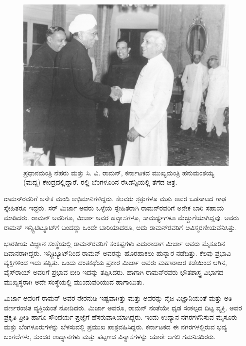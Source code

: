 \begin{figure}[!htpb]
\centering
\includegraphics[scale=0.23]{"images/10.jpg"}
\caption{ಪ್ರಧಾನಮಂತ್ರಿ ನೆಹರು ಮತ್ತು ಸಿ. ವಿ. ರಾಮನ್, ಕರ್ನಾಟಕದ ಮುಖ್ಯಮಂತ್ರಿ ಹನುಮಂತಯ್ಯ (ಮದ್ಯ) ಕೇಂದ್ರದಲ್ಲಿದ್ದಾರೆ. ರಲ್ಲಿ ಬೆಂಗಳೂರಿನ ರೆಸಿಡೆನ್ಸಿಯಲ್ಲಿ ತೆಗೆದ ಚಿತ್ರ.}\label{chap3-fig01}
\end{figure}

\newpage


ರಾಮನ್‍ರವರಿಗೆ ಅನೇಕ ಮಂದಿ ಅಭಿಮಾನಿಗಳಿದ್ದರು. ಕೆಲವರು ಶತ್ರುಗಳೂ ಮತ್ತು ಅವರ ಒಡನಾಟದ ಗಾಢ ಸ್ನೇಹಿತರೂ ಇದ್ದರು. ಸರ್ ಮಿರ್ಜಾ ಅವರು ಒಳ್ಳೆಯ ಸ್ನೇಹಿತರಾಗಿ ರಾಮನ್‍ರವರಿಗೆ ಅನೇಕ ಬಾರಿ ಸಹಾಯ ಮಾಡಿದರು. ರಾಮನ್ ಅವರಿಗೂ, ಮಿರ್ಜಾ ಅವರ ಹವ್ಯಾಸಗಳೂ, ಸಾಮರ್ಥ್ಯಗಳೂ ಮೆಚ್ಚುಗೆಯಾಗಿದ್ದವು. ಅವರು ರಾಮನ್ ಇನ್ಸ್ಟಿಟಿಟ್ಯೂಟ್‍ಗೆ ಬಂದದ್ದು ಒಂದೇ ಬಾರಿಯಾದರೂ, ಅದು ರಾಮನ್‍ರವರಿಗೆ ಅವಿಸ್ಮರಣೀಯವೆನಿಸಿತ್ತು.

ಭಾರತೀಯ ವಿಜ್ಞಾನ ಸಂಸ್ಥೆಯಲ್ಲಿ ರಾಮನ್‍ರವರಿಗೆ ಸಂಕಷ್ಟಗಳು ಎದುರಾದಾಗ ಮಿರ್ಜಾ ಅವರು ಮೈಸೂರಿನ ದಿವಾನರಾಗಿದ್ದರು. ಇನ್ಸ್ಟಿಟ್ಯೂಟ್‍ನಿಂದ ರಾಮನ್ ಅವರನ್ನು ಹೊರಹಾಕಲು ಹುನ್ನಾರ ನಡೆದಿತ್ತು. ಕೆಲವು ಪ್ರಭಾವಿ ವ್ಯಕ್ತಿಗಳಿಂದ ಇದು ತಪ್ಪಿತು. ಒಂದು ದಂತಕಥೆಯ ಪ್ರಕಾರ ಮಿರ್ಜಾ ಅವರು ಮಹಾರಾಜರ ಕಡೆಯಿಂದ ಆಗಿನ, ವೈಸ್‍ರಾಯ್ ಅವರಿಗೆ ಪ್ರಭಾವ ಬೀರಿ ಇದನ್ನು ತಪ್ಪಿಸಿದರು. ಹಾಗಾಗಿ ರಾಮನ್‍ರವರು ಭೌತಶಾಸ್ತ್ರ ವಿಭಾಗದ ಮುಖ್ಯಸ್ಥರಾಗಿ ಅದೇ ಸಂಸ್ಥೆಯಲ್ಲಿ ಮುಂದುವರಿಯುವ ಹಾಗಾಯಿತು.

ಮಿರ್ಜಾ ಅವರಿಗೆ ರಾಮನ್ ಅವರ ನೇರನುಡಿ ಇಷ್ಟವಾಗಿತ್ತು ಮತ್ತು ಅವರನ್ನು ನೈಜ ವಿಜ್ಞಾನಿಯಂತೆ ಮತ್ತು ಅತಿ ವರ್ಣರಂಜಿತ ವ್ಯಕ್ತಿಯಂತೆ ನೋಡಿದರು. ಮಿರ್ಜಾ ಅವರೂ, ರಾಮನ್ ನಂತೆಯೇ ಧೃಡ ಸಂಕಲ್ಪದ ದಿಟ್ಟ ವ್ಯಕ್ತಿ. ಅವರ ಪ್ರಕೃತಿ ಪ್ರೀತಿ ಹಾಗೂ ಸೌಂದರ್ಯ ಪ್ರಜ್ಞೆಗೆ ಹೆಸರುವಾಸಿಯಾಗಿದ್ದರು. ಇಂದು ಉದ್ಯಾನ ನಗರಗಳೆನಿಸುವ  ಮೈಸೂರು ಮತ್ತು ಬೆಂಗಳೂರುಗಳನ್ನು ಬೆಳಸುವಲ್ಲಿ ಪ್ರಮುಖ ಪಾತ್ರವಹಿಸಿದ್ದರು. ಕರ್ನಾಟಕದ ಈ ನಗರಗಳಲ್ಲಿರುವ ಭವ್ಯ ಬಂಗಲೆಗಳು, ಸುಂದರ ಉದ್ಯಾನಗಳು ಮತ್ತು ಪಟ್ಟಣದ ವಿನ್ಯಾಸಗಳನ್ನು ಯಾರೇ ಆಗಲಿ ಗಮನಿಸದಿರರು.

